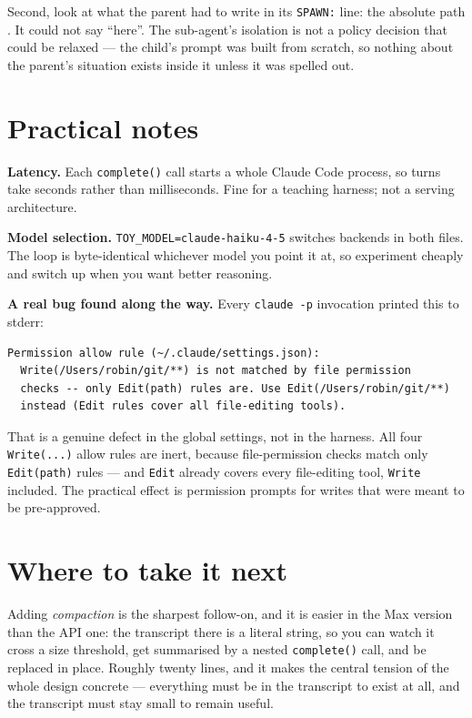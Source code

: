 \documentclass[11pt,a4paper]{article}
\newcommand{\code}[1]{\texttt{#1}}
\begin{document}
Second, look at what the parent had to write in its \code{SPAWN:} line: the
absolute path . It could not say ``here''. The
sub-agent's isolation is not a policy decision that could be relaxed --- the
child's prompt was built from scratch, so nothing about the parent's situation
exists inside it unless it was spelled out.

\section{Practical notes}

\textbf{Latency.} Each \code{complete()} call starts a whole Claude Code
process, so turns take seconds rather than milliseconds. Fine for a teaching
harness; not a serving architecture.

\textbf{Model selection.} \code{TOY\_MODEL=claude-haiku-4-5} switches backends
in both files. The loop is byte-identical whichever model you point it at, so
experiment cheaply and switch up when you want better reasoning.

\textbf{A real bug found along the way.} Every \code{claude -p} invocation
printed this to stderr:

\begin{lstlisting}
Permission allow rule (~/.claude/settings.json):
  Write(/Users/robin/git/**) is not matched by file permission
  checks -- only Edit(path) rules are. Use Edit(/Users/robin/git/**)
  instead (Edit rules cover all file-editing tools).
\end{lstlisting}

That is a genuine defect in the global settings, not in the harness. All four
\code{Write(...)} allow rules are inert, because file-permission checks match
only \code{Edit(path)} rules --- and \code{Edit} already covers every
file-editing tool, \code{Write} included. The practical effect is permission
prompts for writes that were meant to be pre-approved.

\section{Where to take it next}

Adding \emph{compaction} is the sharpest follow-on, and it is easier in the Max
version than the API one: the transcript there is a literal string, so you can
watch it cross a size threshold, get summarised by a nested \code{complete()}
call, and be replaced in place. Roughly twenty lines, and it makes the central
tension of the whole design concrete --- everything must be in the transcript
to exist at all, and the transcript must stay small to remain useful.
\end{document}
